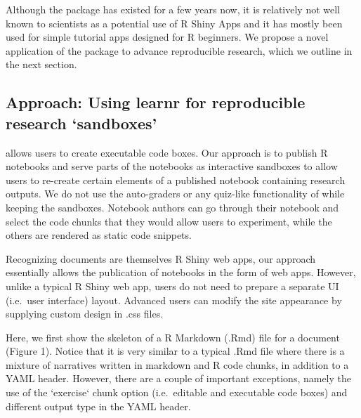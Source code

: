 Although the  package has existed for a few years now,
it is relatively not well known to scientists as a potential use of R
Shiny Apps and it has mostly been used for simple tutorial apps designed
for R beginners. We propose a novel application of the 
package to advance reproducible research, which we outline in the next
section.

\hypertarget{approach-using-learnr-for-reproducible-research-sandboxes}{%
\subsection{\texorpdfstring{Approach: Using learnr for
reproducible research
`sandboxes'}{Approach: Using learnr for reproducible research `sandboxes'}}\label{approach-using-learnr-for-reproducible-research-sandboxes}}

 allows users to create executable code boxes. Our
approach is to publish R notebooks and serve parts of the notebooks as
interactive sandboxes to allow users to re-create certain elements of a
published notebook containing research outputs. We do not use the
auto-graders or any quiz-like functionality of  while
keeping the sandboxes. Notebook authors can go through their notebook
and select the code chunks that they would allow users to experiment,
while the others are rendered as static code snippets.

Recognizing  documents are themselves R Shiny web apps,
our approach essentially allows the publication of notebooks in the form
of web apps. However, unlike a typical R Shiny web app, users do not
need to prepare a separate UI (i.e.~user interface) layout. Advanced
users can modify the site appearance by supplying custom design in .css
files.

Here, we first show the skeleton of a R Markdown (.Rmd) file for a
 document (Figure 1). Notice that it is very similar to
a typical .Rmd file where there is a mixture of narratives written in
markdown and R code chunks, in addition to a YAML header. However,
there are a couple of important exceptions, namely the use of the
`exercise` chunk option (i.e.~editable and executable code boxes)
and different output type in the YAML header.

